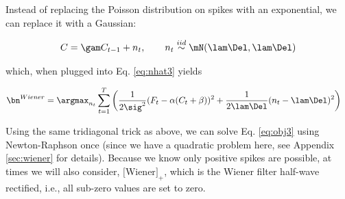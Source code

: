Instead of replacing the Poisson distribution on spikes with an exponential, we can replace it with a Gaussian:

 \begin{align} \label{eq:C3}
	C = \gam C_{t-1} + n_t, \qquad n_t \overset{iid}{\sim} \mN(\lam \Del, \lam \Del)
\end{align}

\noindent which, when plugged into Eq. \eqref{eq:nhat3} yields

\begin{align} \label{eq:obj3}
\bn^{Wiener} &= \argmax_{n_t}  \sum_{t=1}^T \bigg( \frac{1}{2 \sig^2}(F_t - \alpha(C_t + \beta))^2  + 
 \frac{1}{2 \lam \Del}(n_t - \lam \Del)^2\bigg) 
\end{align}

Using the same tridiagonal trick as above, we can solve Eq. \eqref{eq:obj3} using Newton-Raphson once (since we have a quadratic problem here, see Appendix \ref{sec:wiener} for details).  Because we know only positive spikes are possible, at times we will also consider, $[$Wiener$]_+$, which is the Wiener filter half-wave rectified, i.e., all sub-zero values are set to zero.  